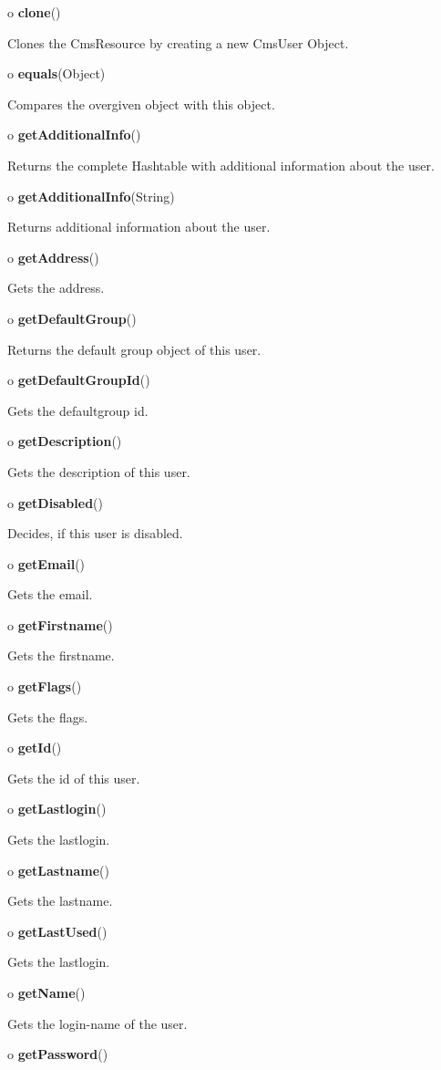 \begin{description}
\item o {\bf clone}()  

Clones the CmsResource by creating a new CmsUser Object.  
\item o {\bf equals}(Object)  

Compares the overgiven object with this object.  
\item o {\bf getAdditionalInfo}()  

Returns the complete Hashtable with additional information about the user.  
\item o {\bf getAdditionalInfo}(String)  

Returns additional information about the user.  
\item o {\bf getAddress}()  

Gets the address.  
\item o {\bf getDefaultGroup}()  

Returns the default group object of this user.  
\item o {\bf getDefaultGroupId}()  

Gets the defaultgroup id.  
\item o {\bf getDescription}()  

Gets the description of this user.  
\item o {\bf getDisabled}()  

Decides, if this user is disabled.  
\item o {\bf getEmail}()  

Gets the email.  
\item o {\bf getFirstname}()  

Gets the firstname.  
\item o {\bf getFlags}()  

Gets the flags.  
\item o {\bf getId}()  

Gets the id of this user.  
\item o {\bf getLastlogin}()  

Gets the lastlogin.  
\item o {\bf getLastname}()  

Gets the lastname.  
\item o {\bf getLastUsed}()  

Gets the lastlogin.  
\item o {\bf getName}()  

Gets the login-name of the user.  
\item o {\bf getPassword}()  


\end{description}
